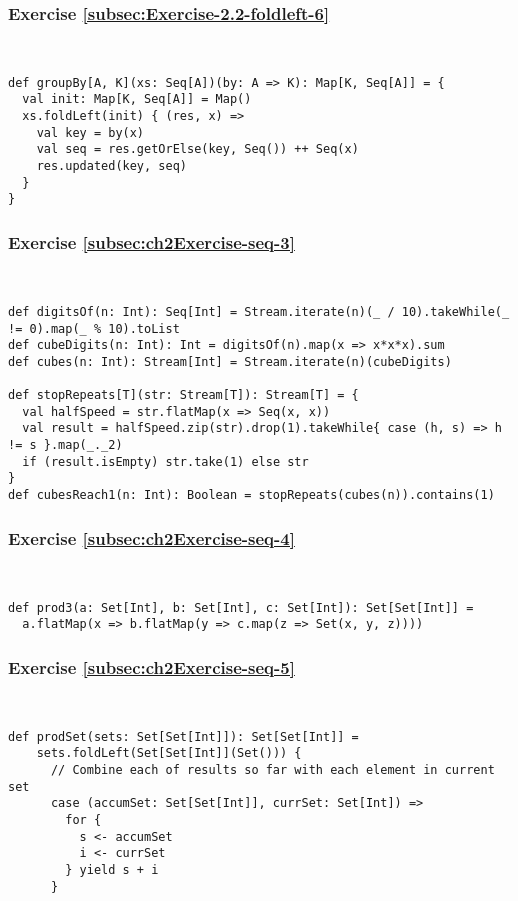\subsubsection*{Exercise \ref{subsec:Exercise-2.2-foldleft-6}}

~
\begin{lstlisting}
def groupBy[A, K](xs: Seq[A])(by: A => K): Map[K, Seq[A]] = {  
  val init: Map[K, Seq[A]] = Map()
  xs.foldLeft(init) { (res, x) =>
    val key = by(x)
    val seq = res.getOrElse(key, Seq()) ++ Seq(x)
    res.updated(key, seq)
  }
}
\end{lstlisting}


\subsubsection*{Exercise \ref{subsec:ch2Exercise-seq-3}}

~
\begin{lstlisting}
def digitsOf(n: Int): Seq[Int] = Stream.iterate(n)(_ / 10).takeWhile(_ != 0).map(_ % 10).toList
def cubeDigits(n: Int): Int = digitsOf(n).map(x => x*x*x).sum
def cubes(n: Int): Stream[Int] = Stream.iterate(n)(cubeDigits)

def stopRepeats[T](str: Stream[T]): Stream[T] = {
  val halfSpeed = str.flatMap(x => Seq(x, x))
  val result = halfSpeed.zip(str).drop(1).takeWhile{ case (h, s) => h != s }.map(_._2)
  if (result.isEmpty) str.take(1) else str
}
def cubesReach1(n: Int): Boolean = stopRepeats(cubes(n)).contains(1)
\end{lstlisting}


\subsubsection*{Exercise \ref{subsec:ch2Exercise-seq-4}}

~
\begin{lstlisting}
def prod3(a: Set[Int], b: Set[Int], c: Set[Int]): Set[Set[Int]] =
  a.flatMap(x => b.flatMap(y => c.map(z => Set(x, y, z))))
\end{lstlisting}


\subsubsection*{Exercise \ref{subsec:ch2Exercise-seq-5}}

~
\begin{lstlisting}
def prodSet(sets: Set[Set[Int]]): Set[Set[Int]] =
    sets.foldLeft(Set[Set[Int]](Set())) {
      // Combine each of results so far with each element in current set
      case (accumSet: Set[Set[Int]], currSet: Set[Int]) =>
        for {
          s <- accumSet
          i <- currSet
        } yield s + i
      }
\end{lstlisting}


